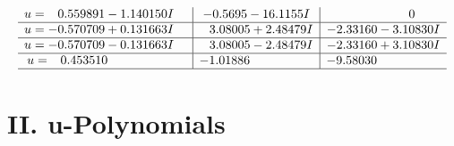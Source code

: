 \documentclass[1p]{elsarticle_modified}
\theoremstyle{definition}
\begin{document}
$$\begin{array}{c|c|c}
\begin{aligned}
u &= \phantom{-}0.559891 - 1.140150 I\end{aligned}
 & -0.5695 - 16.1155 I & \phantom{-0.000000 } 0 \\ \hline\begin{aligned}
u &= -0.570709 + 0.131663 I\end{aligned}
 & \phantom{-}3.08005 + 2.48479 I & -2.33160 - 3.10830 I \\ \hline\begin{aligned}
u &= -0.570709 - 0.131663 I\end{aligned}
 & \phantom{-}3.08005 - 2.48479 I & -2.33160 + 3.10830 I \\ \hline\begin{aligned}
u &= \phantom{-}0.453510\phantom{ +0.000000I}\end{aligned}
 & -1.01886\phantom{ +0.000000I} & -9.58030\phantom{ +0.000000I}\\
 \hline 
 \end{array}$$\newpage
\newpage\renewcommand{\arraystretch}{1}
\centering \section*{ II. u-Polynomials}
\end{document}
